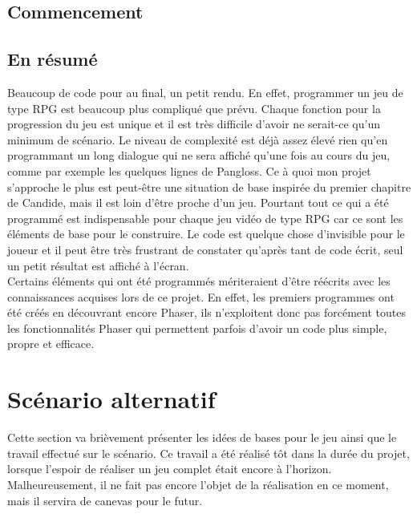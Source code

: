 \documentclass[11pt]{article}
\begin{document}
\subsection{Commencement}
\subsection{En résumé}
Beaucoup de code pour au final, un petit rendu. En effet, programmer un jeu de type RPG est beaucoup plus compliqué que prévu. Chaque fonction pour la progression du jeu est unique et il est très difficile d'avoir ne serait-ce qu'un minimum de scénario. Le niveau de complexité est déjà assez élevé rien qu'en programmant un long dialogue qui ne sera affiché qu'une fois au cours du jeu, comme par exemple les quelques lignes de Pangloss. Ce à quoi mon projet s'approche le plus est peut-être une situation de base inspirée du premier chapitre de Candide, mais il est loin d'être proche d'un jeu. Pourtant tout ce qui a été programmé est indispensable pour chaque jeu vidéo de type RPG car ce sont les éléments de base pour le construire. Le code est quelque chose d'invisible pour le joueur et il peut être très frustrant de constater qu'après tant de code écrit, seul un petit résultat est affiché à l'écran. \\

Certains éléments qui ont été programmés mériteraient d'être réécrits avec les connaissances acquises lors de ce projet. En effet, les premiers programmes ont été créés en découvrant encore Phaser, ils n'exploitent donc pas forcément toutes les fonctionnalités Phaser qui permettent parfois d'avoir un code plus simple, propre et efficace.\\
\section{Scénario alternatif}
Cette section va brièvement présenter les idées de bases pour le jeu ainsi que le travail effectué sur le scénario. Ce travail a été réalisé tôt dans la durée du projet, lorsque l'espoir de réaliser un jeu complet était encore à l'horizon. Malheureusement, il ne fait pas encore l'objet de la réalisation en ce moment, mais il servira de canevas pour le futur.\\

\end{document}
